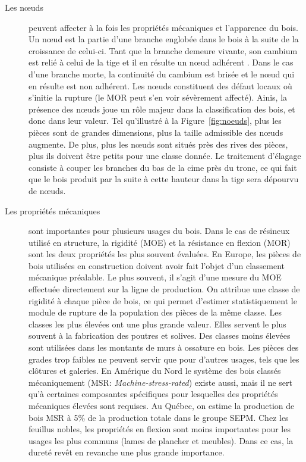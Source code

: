 \begin{description}
	\item[Les nœuds] peuvent affecter à la fois les propriétés mécaniques et l'apparence du bois. Un nœud est la partie d'une branche englobée dans le bois à la suite de la croissance de celui-ci. Tant que la branche demeure vivante, son cambium est relié à celui de la tige et il en résulte un nœud \og adhérent \fg. Dans le cas d'une branche morte, la continuité du cambium est brisée et le nœud qui en résulte est non adhérent. Les nœuds constituent des défaut locaux où s'initie la rupture (le MOR peut s'en voir sévèrement affecté). Ainis, la présence des nœuds joue un rôle majeur dans la classification des bois, et donc dans leur valeur. Tel qu’illustré à la Figure~\ref{fig:noeuds}, plus les pièces sont de grandes dimensions, plus la taille admissible des nœuds augmente. De plus, plus les nœuds sont situés près des rives des pièces, plus ils doivent être petits pour une classe donnée. Le traitement \og d'élagage \fg consiste à couper les branches du bas de la cime près du tronc, ce qui fait que le bois produit par la suite à cette hauteur dans la tige sera dépourvu de nœuds. 
	\item[Les propriétés mécaniques] sont importantes pour plusieurs usages du bois. Dans le cas de résineux utilisé en structure, la rigidité (MOE) et la résistance en flexion (MOR) sont les deux propriétés les plus souvent évaluées. En Europe, les pièces de bois utilisées en construction doivent avoir fait l'objet d'un classement mécanique préalable. Le plus souvent, il s'agit d'une mesure du MOE effectuée directement sur la ligne de production. On attribue une classe de rigidité à chaque pièce de bois, ce qui permet d'estimer statistiquement le module de rupture de la population des pièces de la même classe. Les classes les plus élevées ont une plus grande valeur. Elles servent le plus souvent à la fabrication des poutres et solives. Des classes moins élevées sont utilisées dans les montants de murs à ossature en bois. Les pièces des grades trop faibles ne peuvent servir que pour d'autres usages, tels que les clôtures et galeries. En Amérique du Nord le système des bois classés mécaniquement (MSR: \textit{Machine-stress-rated}) existe aussi, mais il ne sert qu'à certaines composantes spécifiques pour lesquelles des propriétés mécaniques élevées sont requises. Au Québec, on estime la production de bois MSR à 5\% de la production totale dans le groupe SEPM. Chez les feuillus nobles, les propriétés en flexion sont moins importantes pour les usages les plus communs (lames de plancher et meubles). Dans ce cas, la dureté revêt en revanche une plus grande importance.

\end{description}
